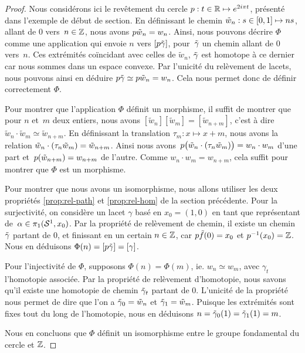 \begin{proof}
Nous considérons ici le revêtement du cercle ${p:t\in\mathbb{R}\mapsto e^{2i\pi t}}$, présenté dans l'exemple de début de section. En définissant le chemin $\Tilde{w}_n:s\in[0,1]\mapsto ns$, allant de 0 vers~$n\in\mathbb{Z}$, nous avons $p\Tilde{w}_n=w_n$. Ainsi, nous pouvons décrire $\Phi$ comme une application qui envoie $n$ vers $[p\Tilde{\gamma}]$, pour~$\Tilde{\gamma}$ un chemin allant de $0$ vers~$n$. Ces extrémités coïncidant avec celles de $\tilde{w}_n$, $\Tilde{\gamma}$ est homotope à ce dernier car nous sommes dans un espace convexe. Par l'unicité du relèvement de lacets, nous pouvons ainsi en déduire $p\Tilde{\gamma}\simeq p\Tilde{w}_n=w_n$. Cela nous permet donc de définir correctement $\Phi$.

\bigskip Pour montrer que l'application $\Phi$ définit un morphisme, il suffit de montrer que pour $n$ et~$m$ deux entiers, nous avons $[\tilde{w}_n][\tilde{w}_m]=[\tilde{w}_{n+m}]$, c'est à dire $\tilde{w}_n\cdot \tilde{w}_m\simeq \tilde{w}_{n+m}$. En définissant la translation $\tau_m:x\mapsto x+m$, nous avons la relation $\Tilde{w}_n\cdot(\tau_n \tilde{w}_m)=\tilde{w}_{n+m}$. Ainsi nous avons~$p\big(\Tilde{w}_n\cdot(\tau_n \Tilde{w}_m)\big)=w_n\cdot w_m$ d'une part et~$p(\Tilde{w}_{n+m})=w_{n+m}$ de l'autre. Comme $w_n\cdot w_m=w_{n+m}$, cela suffit pour montrer que $\Phi$ est un morphisme.

Pour montrer que nous avons un isomorphisme, nous allons utiliser les deux propriétés \ref{prop:rel-path} et \ref{prop:rel-hom} de la section précédente. Pour la surjectivité, on considère un lacet $\gamma$ basé en $x_0=(1,0)$ en tant que représentant de~$\alpha\in\pi_1(\mathcal{S}^{1},x_0)$. Par la propriété de relèvement de chemin, il existe un chemin $\Tilde{\gamma}$ partant de 0, et finissant en un certain $n\in\mathbb{Z}$, car $p\Tilde{f}(0)=x_0$ et $p^{-1}(x_0)=\mathbb{Z}$. Nous en déduisons $\Phi(n)=[p\Tilde{\gamma}]=[\gamma]$.

Pour l'injectivité de $\Phi$, supposons $\Phi(n)=\Phi(m)$, ie. $w_n\simeq w_m$, avec $\gamma_t$ l'homotopie associée. Par la propriété de relèvement d'homotopie, nous savons qu'il existe une homotopie de chemin $\Tilde{\gamma}_t$ partant de 0. L'unicité de la propriété nous permet de dire que l'on a $\Tilde{\gamma}_0=\Tilde{w}_n$ et $\Tilde{\gamma}_1=\Tilde{w}_m$. Puisque les extrémités sont fixes tout du long de l'homotopie, nous en déduisons $n=\Tilde{\gamma}_0(1)=\Tilde{\gamma}_1(1)=m$.

Nous en concluons que $\Phi$ définit un isomorphisme entre le groupe fondamental du cercle et $\mathbb{Z}$.
\end{proof}

